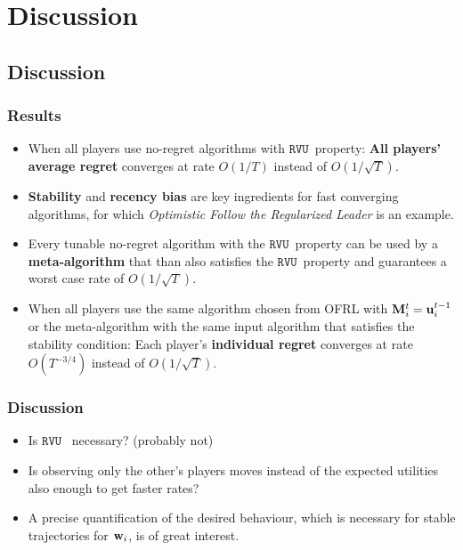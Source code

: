 \documentclass{beamer}
\renewcommand{\vec}[1]{\ensuremath{{\bf #1}}}
\newcommand{\mst}{\ensuremath{w}}
\newcommand{\myprop}{\ensuremath{\texttt{RVU}}}
\begin{document}
\section{Discussion}
\subsection{Discussion}
\begin{frame}
	\frametitle{Results}
		\begin{itemize}
			\item When all players use no-regret algorithms with \myprop~property: \textbf{All players' average regret} converges at rate $O(1/T)$ instead of $O(1/\sqrt{T})$. \pause
			\item \textbf{Stability} and \textbf{recency bias} are key ingredients for fast converging algorithms, for which \textit{Optimistic Follow the Regularized Leader} is an example. \pause
			\item Every tunable no-regret algorithm with the \myprop~property can be used by a \textbf{meta-algorithm} that than also satisfies the \myprop~property and guarantees a worst case rate of $O(1/\sqrt{T})$. \pause
			\item When all players use the same algorithm chosen from OFRL with $\vec{M}_i^t = \vec{u}_i^{t-1}$ or the meta-algorithm with the same input algorithm that satisfies the stability condition: Each player's \textbf{individual regret} converges at rate $O(T^{-3/4})$ instead of $O(1/\sqrt{T})$.
		\end{itemize}
\end{frame}

\begin{frame}
	\frametitle{Discussion}
		\begin{itemize}
			\item Is \myprop~ necessary? (probably not)
			\item Is observing only the other's players moves instead of the expected utilities also enough to get faster rates?
			\item A precise quantification of the desired behaviour, which is necessary for stable trajectories for $\vec{\mst}_i$, is of great interest.
		\end{itemize}
\end{frame}



\section{}
\end{document}
